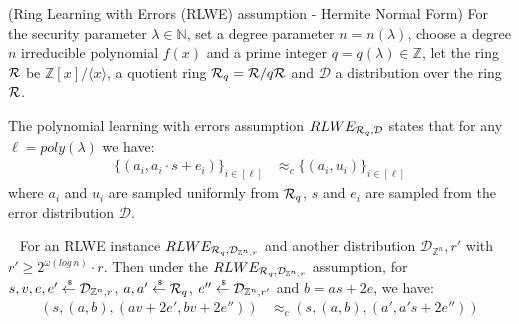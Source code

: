 \begin{definition}{(Ring Learning with Errors (RLWE) assumption - Hermite Normal Form)}
  For the security parameter $\lambda \in \mathbb{N}$, set a degree parameter $n = n(\lambda)$, choose a degree $n$ irreducible polynomial $f(x)$ and a prime integer $q = q(\lambda) \in \mathbb{Z}$, let the ring ${\mathcal{R}}$ be $\mathbb{Z}[x]/\langle x \rangle$, a quotient ring  ${\mathcal{R}}_q = {\mathcal{R}}/ q{\mathcal{R}}$ and $\mathcal{D}$ a distribution over the ring ${\mathcal{R}}$.

  The polynomial learning with errors assumption $RLWE_{{\mathcal{R}}_q, \mathcal{D}}$ states that for any $\ell = poly(\lambda)$ we have:
  \begin{align*}
    \{(a_i, a_i \cdot s + e_i)\}_{i \in [\ell]} &\approx_c \{(a_i, u_i)\}_{i \in [\ell]}
  \end{align*}
  where $a_i$ and $u_i$ are sampled uniformly from ${\mathcal{R}}_q$, $s$ and $e_i$ are sampled from the error distribution $\mathcal{D}$.

\end{definition}

\begin{lemma}~\cite{DBLP:conf/crypto/BrakerskiV11}
  For an RLWE instance $RLWE_{{\mathcal{R}}_q, \mathcal{D}_{\mathbb{Z}^n, r}}$ and another distribution $\mathcal{D}_{\mathbb{Z}^n},r'$ with $r' \geq 2^{\omega(log~n)} \cdot r$.
  Then under the $RLWE_{{\mathcal{R}}_q, \mathcal{D}_{\mathbb{Z}^n, r}}$ assumption, for $s, v, e, e' \stackrel{{\scriptscriptstyle \mkern4mu \$}}{\gets} \mathcal{D}_{\mathbb{Z}^n,r}$, $a, a' \stackrel{{\scriptscriptstyle \mkern4mu \$}}{\gets} {\mathcal{R}}_q$, $e'' \stackrel{{\scriptscriptstyle \mkern4mu \$}}{\gets} \mathcal{D}_{\mathbb{Z}^n, r'}$ and $b = as + 2e$,
  we have:
  \begin{align*}
    (s, (a, b), (av + 2e', bv + 2e'')) &\approx_c (s, (a,b), (a', a's+2e''))
  \end{align*}
\end{lemma}
